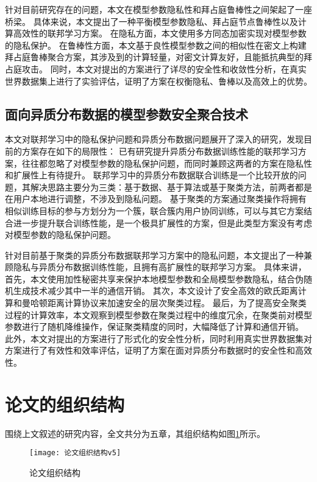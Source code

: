 针对目前研究存在的问题，本文在模型参数隐私性和拜占庭鲁棒性之间架起了一座桥梁。
具体来说，本文提出了一种平衡模型参数隐私、拜占庭节点鲁棒性以及计算高效性的联邦学习方案。
在隐私方面，本文使用多方同态加密实现对模型参数的隐私保护。
在鲁棒性方面，本文基于良性模型参数之间的相似性在密文上构建拜占庭鲁棒聚合方案，其涉及到的计算轻量，对密文计算友好，且能抵抗典型的拜占庭攻击。
同时，本文对提出的方案进行了详尽的安全性和收敛性分析，在真实世界数据集上进行了实验评估，证明了方案在权衡隐私、鲁棒以及高效上的优势。

\subsection{面向异质分布数据的模型参数安全聚合技术}
本文对联邦学习中的隐私保护问题和异质分布数据问题展开了深入的研究，发现目前的方案存在如下的局限性：
已有研究提升异质分布数据训练性能的联邦学习方案，往往都忽略了对模型参数的隐私保护问题，而同时兼顾这两者的方案在隐私性和扩展性上有待提升。
联邦学习中的异质分布数据联合训练是一个比较开放的问题，其解决思路主要分为三类：基于数据、基于算法或基于聚类方法，前两者都是在用户本地进行调整，不涉及到隐私问题。
基于聚类的方案通过聚类操作将拥有相似训练目标的参与方划分为一个簇，联合簇内用户协同训练，可以与其它方案结合进一步提升联合训练性能，是一个极具扩展性的方案，但是此类型方案没有考虑对模型参数的隐私保护问题。

针对目前基于聚类的异质分布数据联邦学习方案中的隐私问题，本文提出了一种兼顾隐私与异质分布数据训练性能，且拥有高扩展性的联邦学习方案。
具体来讲，
首先，本文使用加性秘密共享来保护本地模型参数和全局模型参数隐私，结合伪随机生成技术减少其中一半的通信开销。
其次，本文设计了安全高效的欧氏距离计算和曼哈顿距离计算协议来加速安全的层次聚类过程。
最后，为了提高安全聚类过程的计算效率，本文观察到模型参数在聚类过程中的维度冗余，在聚类前对模型参数进行了随机降维操作，保证聚类精度的同时，大幅降低了计算和通信开销。
此外，本文对提出的方案进行了形式化的安全性分析，同时利用真实世界数据集对方案进行了有效性和效率评估，证明了方案在面对异质分布数据时的安全性和高效性。

\section{论文的组织结构}
围绕上文叙述的研究内容，全文共分为五章，其组织结构如图\ref{struct}所示。

\begin{figure}[htbp]
	\centering
	\texttt{[image: 论文组织结构v5]}
	\caption{论文组织结构}
	\label{struct}
\end{figure}

